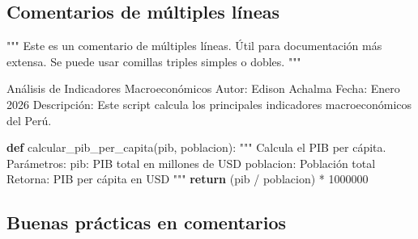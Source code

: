\documentclass[
  doc,
  floatsintext,
  longtable,
  a4paper,
  nolmodern,
  notxfonts,
  notimes,
  12pt,
  colorlinks=true,linkcolor=blue,citecolor=blue,urlcolor=blue]{apa7}
\newenvironment{Shaded}{\begin{snugshade}}{\end{snugshade}}
\newcommand{\CommentTok}[1]{\textcolor[rgb]{0.37,0.37,0.37}{#1}}
\newcommand{\ControlFlowTok}[1]{\textcolor[rgb]{0.00,0.23,0.31}{\textbf{#1}}}
\newcommand{\DecValTok}[1]{\textcolor[rgb]{0.68,0.00,0.00}{#1}}
\newcommand{\KeywordTok}[1]{\textcolor[rgb]{0.00,0.23,0.31}{\textbf{#1}}}
\newcommand{\NormalTok}[1]{\textcolor[rgb]{0.00,0.23,0.31}{#1}}
\newcommand{\OperatorTok}[1]{\textcolor[rgb]{0.37,0.37,0.37}{#1}}
\begin{document}
\subsection{Comentarios de múltiples
líneas}\label{comentarios-de-muxfaltiples-luxedneas}

\begin{Shaded}
\begin{Highlighting}[]
\CommentTok{"""}
\CommentTok{Este es un comentario de múltiples líneas.}
\CommentTok{Útil para documentación más extensa.}
\CommentTok{Se puede usar comillas triples simples o dobles.}
\CommentTok{"""}

\CommentTok{\textquotesingle{}\textquotesingle{}\textquotesingle{}}
\CommentTok{Análisis de Indicadores Macroeconómicos}
\CommentTok{Autor: Edison Achalma}
\CommentTok{Fecha: Enero 2026}
\CommentTok{Descripción: Este script calcula los principales}
\CommentTok{indicadores macroeconómicos del Perú.}
\CommentTok{\textquotesingle{}\textquotesingle{}\textquotesingle{}}

\KeywordTok{def}\NormalTok{ calcular\_pib\_per\_capita(pib, poblacion):}
    \CommentTok{"""}
\CommentTok{    Calcula el PIB per cápita.}
\CommentTok{    }
\CommentTok{    Parámetros:}
\CommentTok{    pib: PIB total en millones de USD}
\CommentTok{    poblacion: Población total}
\CommentTok{    }
\CommentTok{    Retorna:}
\CommentTok{    PIB per cápita en USD}
\CommentTok{    """}
    \ControlFlowTok{return}\NormalTok{ (pib }\OperatorTok{/}\NormalTok{ poblacion) }\OperatorTok{*} \DecValTok{1000000}
\end{Highlighting}
\end{Shaded}

\subsection{Buenas prácticas en
comentarios}\label{buenas-pruxe1cticas-en-comentarios}
\end{document}
